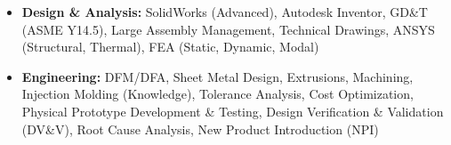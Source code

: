\documentclass[11pt, letterpaper]{article}
\begin{document}
\begin{itemize}[leftmargin=*, label=\textbullet]
\setlength\itemsep{-2pt}
\vspace{-8pt}
\item \textbf{Design \& Analysis:} SolidWorks (Advanced), Autodesk Inventor, GD\&T (ASME Y14.5), Large Assembly Management, Technical Drawings, ANSYS (Structural, Thermal), FEA (Static, Dynamic, Modal)
\item \textbf{Engineering:} DFM/DFA, Sheet Metal Design, Extrusions, Machining, Injection Molding (Knowledge), Tolerance Analysis, Cost Optimization, Physical Prototype Development \& Testing, Design Verification \& Validation (DV\&V), Root Cause Analysis, New Product Introduction (NPI)
\end{itemize}
\end{document}
